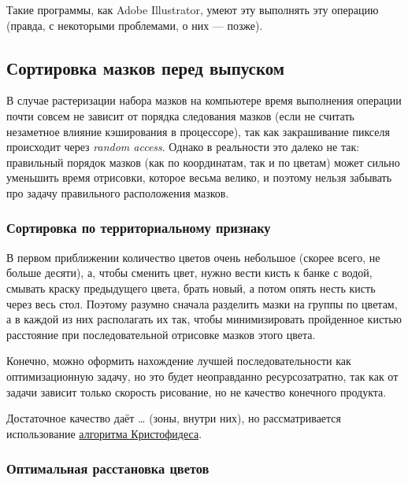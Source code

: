 Такие программы, как Adobe Illustrator, умеют эту выполнять эту операцию (правда, с некоторыми проблемами, о них — позже).





\subsection{Сортировка мазков перед выпуском}\label{subsec:stroke_sorting}

В случае растеризации набора мазков на компьютере время выполнения операции почти совсем не зависит от порядка следования мазков
(если не считать незаметное влияние кэширования в процессоре), так как закрашивание пикселя происходит через \textit{random access}.
Однако в реальности это далеко не так: правильный порядок мазков (как по координатам, так и по цветам) может сильно уменьшить время отрисовки, которое весьма велико,
и поэтому нельзя забывать про задачу правильного расположения мазков.

\subsubsection{Сортировка по территориальному признаку}
В первом приближении количество цветов очень небольшое (скорее всего, не больше десяти),
а, чтобы сменить цвет, нужно вести кисть к банке с водой, смывать краску предыдущего цвета, брать новый,
а потом опять несть кисть через весь стол.
Поэтому разумно сначала разделить мазки на группы по цветам, а в каждой из них располагать их так,
чтобы минимизировать пройденное кистью расстояние при последовательной отрисовке мазков этого цвета.


Конечно, можно оформить нахождение лучшей последовательности как оптимизационную задачу,
но это будет неоправданно ресурсозатратно, так как от задачи зависит только скорость рисование, но не качество конечного продукта.

Достаточное качество даёт … (зоны, внутри них), но рассматривается использование \href{https://en.wikipedia.org/wiki/Christofides_algorithm}{алгоритма Кристофидеса}.

\subsubsection{Оптимальная расстановка цветов}

